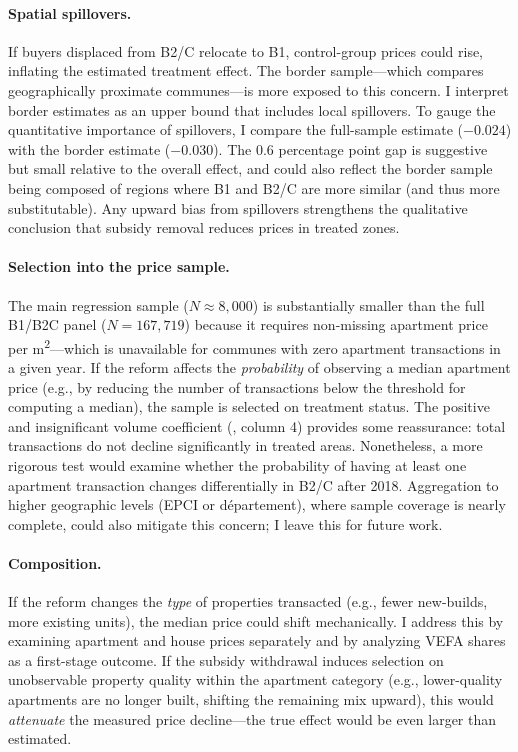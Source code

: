 \documentclass[12pt]{article}
\begin{document}
\paragraph{Spatial spillovers.} If buyers displaced from B2/C relocate to B1, control-group prices could rise, inflating the estimated treatment effect. The border sample---which compares geographically proximate communes---is more exposed to this concern. I interpret border estimates as an upper bound that includes local spillovers. To gauge the quantitative importance of spillovers, I compare the full-sample estimate ($-0.024$) with the border estimate ($-0.030$). The 0.6 percentage point gap is suggestive but small relative to the overall effect, and could also reflect the border sample being composed of regions where B1 and B2/C are more similar (and thus more substitutable). Any upward bias from spillovers strengthens the qualitative conclusion that subsidy removal reduces prices in treated zones.

\paragraph{Selection into the price sample.} The main regression sample ($N \approx 8{,}000$) is substantially smaller than the full B1/B2C panel ($N = 167{,}719$) because it requires non-missing apartment price per m\textsuperscript{2}---which is unavailable for communes with zero apartment transactions in a given year. If the reform affects the \textit{probability} of observing a median apartment price (e.g., by reducing the number of transactions below the threshold for computing a median), the sample is selected on treatment status. The positive and insignificant volume coefficient (, column 4) provides some reassurance: total transactions do not decline significantly in treated areas. Nonetheless, a more rigorous test would examine whether the probability of having at least one apartment transaction changes differentially in B2/C after 2018. Aggregation to higher geographic levels (EPCI or d\'{e}partement), where sample coverage is nearly complete, could also mitigate this concern; I leave this for future work.

\paragraph{Composition.} If the reform changes the \textit{type} of properties transacted (e.g., fewer new-builds, more existing units), the median price could shift mechanically. I address this by examining apartment and house prices separately and by analyzing VEFA shares as a first-stage outcome. If the subsidy withdrawal induces selection on unobservable property quality within the apartment category (e.g., lower-quality apartments are no longer built, shifting the remaining mix upward), this would \textit{attenuate} the measured price decline---the true effect would be even larger than estimated.
\end{document}
